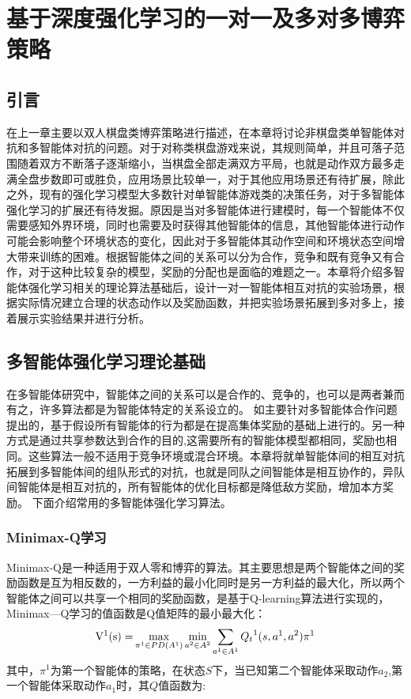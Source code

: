 \chapter{基于深度强化学习的一对一及多对多博弈策略}
\section{引言}
在上一章主要以双人棋盘类博弈策略进行描述，在本章将讨论非棋盘类单智能体对抗和多智能体对抗的问题。对于对称类棋盘游戏来说，其规则简单，并且可落子范围随着双方不断落子逐渐缩小，当棋盘全部走满双方平局，也就是动作双方最多走满全盘步数即可或胜负，应用场景比较单一，对于其他应用场景还有待扩展，除此之外，现有的强化学习模型大多数针对单智能体游戏类的决策任务，对于多智能体强化学习的扩展还有待发掘。原因是当对多智能体进行建模时，每一个智能体不仅需要感知外界环境，同时也需要及时获得其他智能体的信息，其他智能体进行动作可能会影响整个环境状态的变化，因此对于多智能体其动作空间和环境状态空间增大带来训练的困难。根据智能体之间的关系可以分为合作，竞争和既有竞争又有合作，对于这种比较复杂的模型，奖励的分配也是面临的难题之一。本章将介绍多智能体强化学习相关的理论算法基础后，设计一对一智能体相互对抗的实验场景，根据实际情况建立合理的状态动作以及奖励函数，并把实验场景拓展到多对多上，接着展示实验结果并进行分析。
\section{多智能体强化学习理论基础}
在多智能体研究中，智能体之间的关系可以是合作的、竞争的，也可以是两者兼而有之，许多算法都是为智能体特定的关系设立的。
如\cite{Lazaridou2017Multi}主要针对多智能体合作问题提出的，基于假设所有智能体的行为都是在提高集体奖励的基础上进行的。另一种方式是通过共享参数达到合作的目的\cite{Gupta2017Cooperative},这需要所有的智能体模型都相同，奖励也相同。这些算法一般不适用于竞争环境或混合环境。本章将就单智能体间的相互对抗拓展到多智能体间的组队形式的对抗，也就是同队之间智能体是相互协作的，异队间智能体是相互对抗的，所有智能体的优化目标都是降低敌方奖励，增加本方奖励。
下面介绍常用的多智能体强化学习算法。
\subsection{Minimax-Q学习}
Minimax-Q\cite{Littman1994Markov}是一种适用于双人零和博弈的算法。其主要思想是两个智能体之间的奖励函数是互为相反数的，一方利益的最小化同时是另一方利益的最大化，所以两个智能体之间可以共享一个相同的奖励函数，是基于Q-learning算法进行实现的，Minimax—Q学习的值函数是Q值矩阵的最小最大化：
\begin{equation}
{{\rm{V}}^1}{\rm{(s) = }}\mathop {\max }\limits_{{\pi ^1} \in PD({A^1})} \mathop {\min }\limits_{{a^2} \in {A^2}} \sum\limits_{{a^1} \in {A^1}} {{Q_t}^1(s,{a^1},{a^2})} {\pi ^1}
\end{equation}
其中，${\pi ^1}$为第一个智能体的策略，在状态$S$下，当已知第二个智能体采取动作$a_2$,第一个智能体采取动作$a_1$时，其$Q$值函数为:


